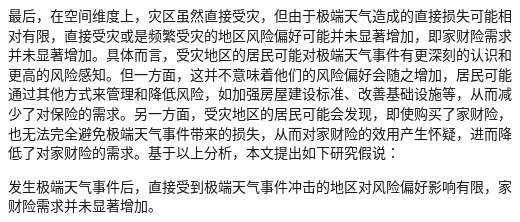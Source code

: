 最后，在空间维度上，灾区虽然直接受灾，但由于极端天气造成的直接损失可能相对有限，直接受灾或是频繁受灾的地区风险偏好可能并未显著增加\citep{shao2024typhoons}，即家财险需求并未显著增加。具体而言，受灾地区的居民可能对极端天气事件有更深刻的认识和更高的风险感知。但一方面，这并不意味着他们的风险偏好会随之增加，居民可能通过其他方式来管理和降低风险，如加强房屋建设标准、改善基础设施等，从而减少了对保险的需求。另一方面，受灾地区的居民可能会发现，即使购买了家财险，也无法完全避免极端天气事件带来的损失，从而对家财险的效用产生怀疑，进而降低了对家财险的需求。基于以上分析，本文提出如下研究假说：

\begin{hyp} \label{hyp:2}
    发生极端天气事件后，直接受到极端天气事件冲击的地区对风险偏好影响有限，家财险需求并未显著增加。
\end{hyp}
